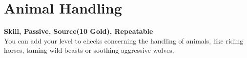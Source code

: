 \section{Animal Handling}\label{sec:animalHandling}
\textbf{Skill, Passive, Source(10 Gold), Repeatable}\\
You can add your level to checks concerning the handling of animals, like riding horses, taming wild beasts or soothing aggressive wolves.